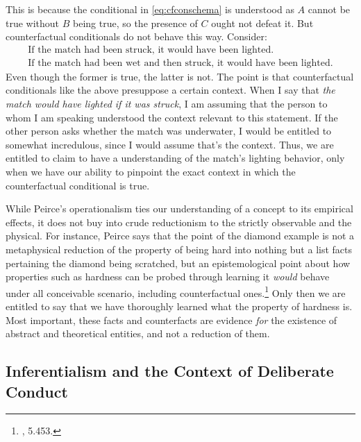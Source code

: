 This is because the conditional in \ref{eq:cfconschema} is understood as \(A\) cannot be
true without \(B\) being true, so the presence of \(C\) ought not defeat
it. But counterfactual conditionals do not behave this way. Consider:
\begin{gather}
	\text{If the match had been struck, it would have been lighted.}\label{eq:cfconextrue}\\
	\text{If the match had been wet and then struck, it would have been lighted.}\label{eq:cfconexfalse}
\end{gather}
%
Even though the former is true, the latter is not. The point is that
counterfactual conditionals like the above presuppose a certain context.
When I say that \emph{the match would have lighted if it was struck}, I am
assuming that the person to whom I am speaking understood the context
relevant to this statement. If the other person asks whether the match was underwater, I would be entitled to somewhat incredulous, since I would assume that's the context. Thus, we are entitled to claim to have a understanding of the match's lighting behavior, only when we have our ability to pinpoint the exact context in which the counterfactual conditional is true.

While Peirce's operationalism ties our understanding of a concept
to its empirical effects, it does not buy into crude reductionism to the
strictly observable and the physical. For instance, Peirce says that the
point of the diamond example is not a metaphysical reduction of the
property of being hard into nothing but a list facts pertaining the
diamond being scratched, but an epistemological point about how
properties such as hardness can be probed through learning it
\emph{would} behave under all conceivable scenario, including
counterfactual ones.\footnote{\cite{CP}, 5.453.} Only then we are entitled to say that we have
thoroughly learned what the property of hardness is. Most important,
these facts and counterfacts are evidence \emph{for} the existence of
abstract and theoretical entities, and not a reduction of them.

\hypertarget{inferentialism-and-the-context-of-deliberate-conduct}{%
\subsection{Inferentialism and the Context of Deliberate
Conduct}\label{sec:inferentialism-and-the-context-of-deliberate-conduct}}

